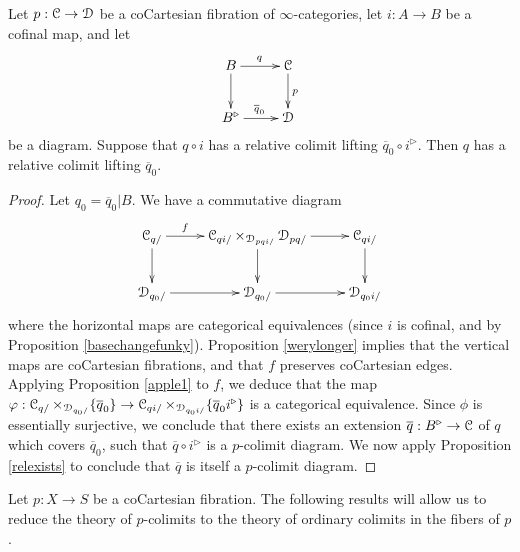 \begin{proposition}\label{relexist}
Let $p: \operatorname{\mathcal{C}} \rightarrow \operatorname{\mathcal{D}}$ be a coCartesian fibration of $\infty$-categories, let $i: A \rightarrow B$ be a cofinal map, and let 
$$ \xymatrix{ B \ar[r]^{q} \ar[d] & \calC \ar[d]^{p} \\
B^{\triangleright} \ar[r]^{\overline{q}_0} & \calD }$$
be a diagram. Suppose that $q \circ i$
has a relative colimit lifting $\overline{q}_0 \circ i^{\triangleright}$. Then $q$ has a relative colimit lifting $\overline{q}_0$.
\end{proposition}

\begin{proof}
Let $q_0 = \overline{q}_0 | B$. We have a commutative diagram
$$ \xymatrix{ \calC_{q/} \ar[r]^-{f} \ar[d] & \calC_{q  i/} \times_{ \calD_{p  q  i/} } \calD_{p  q/} \ar[r] \ar[d] & \calC_{q  i/} \ar[d] \\
\calD_{q_0/} \ar[r] & \calD_{q_0/} \ar[r] & \calD_{q_0  i/} } $$
where the horizontal maps are categorical equivalences (since $i$ is cofinal, and by
Proposition \ref{basechangefunky}). Proposition \ref{werylonger} implies that the vertical maps are coCartesian fibrations, and that $f$ preserves coCartesian edges. Applying Proposition \ref{apple1} to $f$, we deduce that the map
$\varphi: \operatorname{\mathcal{C}}_{q/} \times_{ \operatorname{\mathcal{D}}_{q_0/} } \{ \overline{q}_0 \} \rightarrow
\operatorname{\mathcal{C}}_{q  i/ } \times_{ \operatorname{\mathcal{D}}_{q_0  i/} } \{ \overline{q}_0  i^{\triangleright} \}$
is a categorical equivalence. Since $\phi$ is essentially surjective, we conclude that
there exists an extension $\overline{q}: B^{\triangleright} \rightarrow \operatorname{\mathcal{C}}$ of $q$
which covers $\overline{q}_0$, such that $\overline{q} \circ i^{\triangleright}$ is a $p$-colimit diagram. We now apply Proposition \ref{relexists} to conclude that $\overline{q}$ is itself a $p$-colimit diagram.
\end{proof}

Let $p: X \rightarrow S$ be a coCartesian fibration. 
The following results will allow us to reduce the theory of $p$-colimits to the theory of ordinary colimits in the fibers of $p$.

